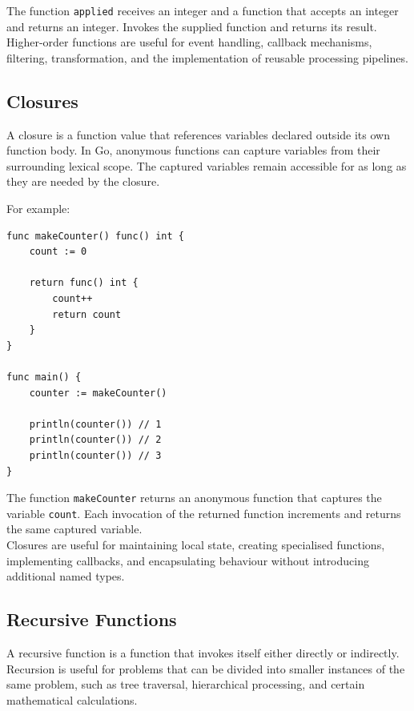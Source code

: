 The function \texttt{applied} receives an integer and a function that accepts an integer and returns an integer. Invokes the supplied function and returns its result.\\

Higher-order functions are useful for event handling, callback mechanisms, filtering, transformation, and the implementation of reusable processing pipelines.

\subsection{Closures}

A closure is a function value that references variables declared outside its own function body. In Go, anonymous functions can capture variables from their surrounding lexical scope. The captured variables remain accessible for as long as they are needed by the closure.

For example:

\begin{lstlisting}
func makeCounter() func() int {
    count := 0

    return func() int {
        count++
        return count
    }
}

func main() {
    counter := makeCounter()

    println(counter()) // 1
    println(counter()) // 2
    println(counter()) // 3
}
\end{lstlisting}

The function \texttt{makeCounter} returns an anonymous function that captures the variable \texttt{count}. Each invocation of the returned function increments and returns the same captured variable.\\

Closures are useful for maintaining local state, creating specialised functions, implementing callbacks, and encapsulating behaviour without introducing additional named types.

\subsection{Recursive Functions}

A recursive function is a function that invokes itself either directly or indirectly. Recursion is useful for problems that can be divided into smaller instances of the same problem, such as tree traversal, hierarchical processing, and certain mathematical calculations.\\

